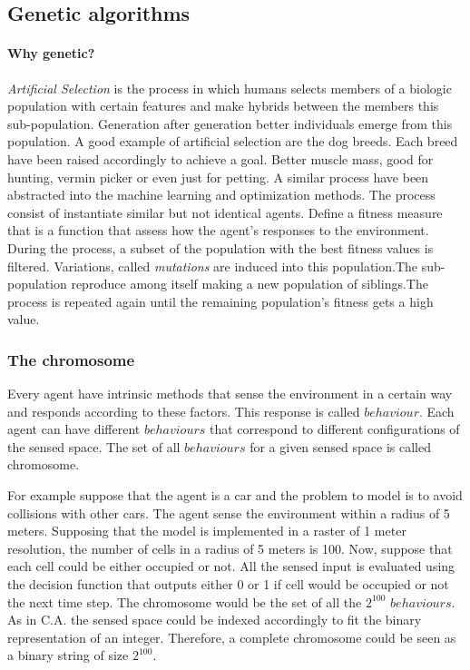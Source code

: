 \documentclass[fleqn,10pt]{SelfArx} %
\begin{document}
\subsection{Genetic algorithms}
\paragraph{Why genetic?} {\em Artificial Selection} is the process in which humans selects members of a biologic population with certain features and make hybrids between the members this sub-population. Generation after generation better individuals emerge from this population. A good example of artificial selection are the dog breeds. Each breed have been raised accordingly to achieve a goal. Better muscle mass, good for hunting, vermin picker or even just for petting. 
A similar process have been abstracted into the machine learning and optimization methods. The process consist of instantiate similar but not identical agents. Define a fitness measure that is a function that assess how the agent's responses to the environment. During the process, a subset of the population with the best fitness values is filtered. Variations, called {\em mutations} are induced into this population.The sub-population reproduce among itself making a new population of siblings.The process is repeated again until the remaining population's fitness gets a high value. 

\subsubsection{The chromosome}
Every agent have intrinsic methods that sense the environment in a certain way and responds according to these factors. This response is called $behaviour$. Each agent can have different $behaviours$ that correspond to different configurations of the sensed space. The set of all $behaviours$ for a given sensed space is called chromosome. 

For example suppose that the agent is a car and the problem to model is to avoid collisions with other cars. The agent sense the environment within a radius of 5 meters. Supposing that the model is implemented in a raster of 1 meter resolution, the number of cells in a radius of 5 meters is 100. Now, suppose that each cell could be either occupied or not. All the sensed input is evaluated using the decision function that outputs either 0 or 1 if cell would be occupied or not the next time step. The chromosome would be the set of all the $2^{100}$ $behaviours$. As in C.A. the sensed space could be indexed accordingly to fit the binary representation of an integer. Therefore, a complete chromosome could be seen as a binary string of size $2^{100}$.
 
\end{document}
